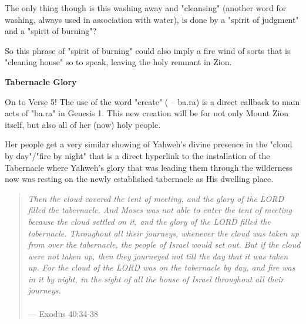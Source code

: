 \documentclass[11pt]{article}
\begin{document}
{\vspace{1em}}

The only thing though is this washing away and "cleansing" (another word for washing, always used in association with water), is done by a "spirit of judgment" and a "spirit of burning"?

{\vspace{1em}}


So this phrase of "spirit of burning" could also imply a fire wind of sorts that is "cleaning house" so to speak, leaving the holy remnant in Zion.


\vspace{3em}
{\large\bfseries Tabernacle Glory}
\vspace{1em}



On to Verse 5! The use of the word "create" ( – ba.ra) is a direct callback to main acts of "ba.ra" in Genesis 1.
This new creation will be for not only Mount Zion itself, but also all of her (now) holy people.

{\vspace{1em}}

Her people get a very similar showing of Yahweh's divine presence in the "cloud by day"/"fire by night" that is a direct hyperlink to the installation of the Tabernacle where
Yahweh's glory that was leading them through the wilderness now was resting on the newly established tabernacle as His dwelling place.

\begin{quote}
\textit{
Then the cloud covered the tent of meeting, and the glory of the LORD filled the tabernacle.
And Moses was not able to enter the tent of meeting because the cloud settled on it, and the glory of the LORD filled the tabernacle. 
Throughout all their journeys, whenever the cloud was taken up from over the tabernacle, the people of Israel would set out. 
But if the cloud were not taken up, then they journeyed not till the day that it was taken up.
For the cloud of the LORD was on the tabernacle by day, and fire was in it by night, in the sight of all the house of Israel throughout all their journeys.
}
\\\\
\hfill --- Exodus 40:34-38
\end{quote}
\end{document}
